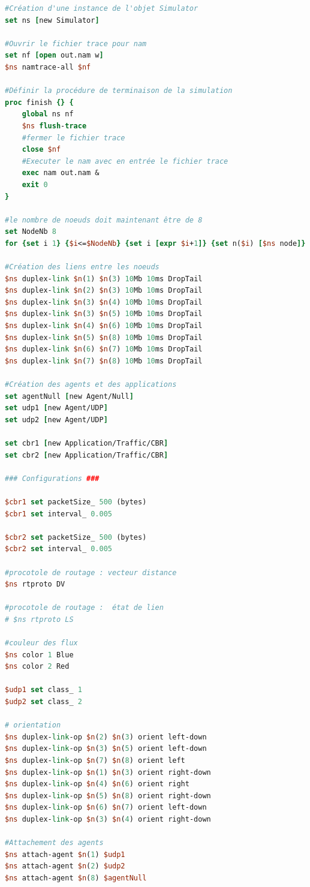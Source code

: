 \documentclass[11pt]{article}
\begin{document}
\begin{enumerate}
\begin{lstlisting}[language=tcl, label={tp2Exo1}, caption={TP2 - Exercice1}]
#Création d'une instance de l'objet Simulator
set ns [new Simulator]

#Ouvrir le fichier trace pour nam
set nf [open out.nam w]
$ns namtrace-all $nf

#Définir la procédure de terminaison de la simulation
proc finish {} {
	global ns nf
	$ns flush-trace
	#fermer le fichier trace
	close $nf
	#Executer le nam avec en entrée le fichier trace
	exec nam out.nam &
	exit 0
}

#le nombre de noeuds doit maintenant être de 8
set NodeNb 8
for {set i 1} {$i<=$NodeNb} {set i [expr $i+1]} {set n($i) [$ns node]}

#Création des liens entre les noeuds
$ns duplex-link $n(1) $n(3) 10Mb 10ms DropTail
$ns duplex-link $n(2) $n(3) 10Mb 10ms DropTail
$ns duplex-link $n(3) $n(4) 10Mb 10ms DropTail
$ns duplex-link $n(3) $n(5) 10Mb 10ms DropTail
$ns duplex-link $n(4) $n(6) 10Mb 10ms DropTail
$ns duplex-link $n(5) $n(8) 10Mb 10ms DropTail
$ns duplex-link $n(6) $n(7) 10Mb 10ms DropTail
$ns duplex-link $n(7) $n(8) 10Mb 10ms DropTail

#Création des agents et des applications
set agentNull [new Agent/Null]
set udp1 [new Agent/UDP]
set udp2 [new Agent/UDP]

set cbr1 [new Application/Traffic/CBR]
set cbr2 [new Application/Traffic/CBR]

### Configurations ### 

$cbr1 set packetSize_ 500 (bytes)
$cbr1 set interval_ 0.005

$cbr2 set packetSize_ 500 (bytes)
$cbr2 set interval_ 0.005

#procotole de routage : vecteur distance
$ns rtproto DV

#procotole de routage :  état de lien
# $ns rtproto LS

#couleur des flux
$ns color 1 Blue
$ns color 2 Red

$udp1 set class_ 1
$udp2 set class_ 2

# orientation
$ns duplex-link-op $n(2) $n(3) orient left-down
$ns duplex-link-op $n(3) $n(5) orient left-down
$ns duplex-link-op $n(7) $n(8) orient left
$ns duplex-link-op $n(1) $n(3) orient right-down
$ns duplex-link-op $n(4) $n(6) orient right
$ns duplex-link-op $n(5) $n(8) orient right-down
$ns duplex-link-op $n(6) $n(7) orient left-down
$ns duplex-link-op $n(3) $n(4) orient right-down

#Attachement des agents
$ns attach-agent $n(1) $udp1
$ns attach-agent $n(2) $udp2
$ns attach-agent $n(8) $agentNull


\end{lstlisting}
\end{enumerate}
\end{document}
